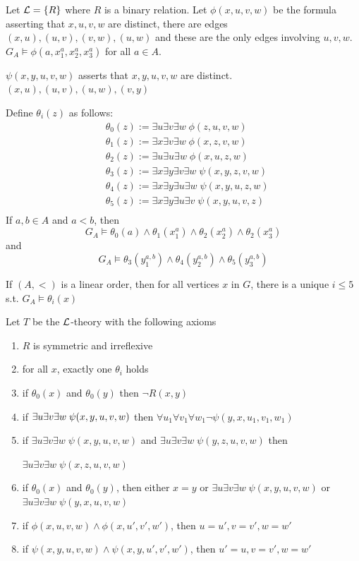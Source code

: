 \documentclass[11pt]{article}
\begin{document}
Let \(\mathcal{L}=\{R\}\) where \(R\) is a binary relation. Let \(\phi(x,u,v,w)\) be the
formula asserting that \(x,u,v,w\) are distinct, there are edges
\((x,u),(u,v),(v,w),(u,w)\) and these are the only edges involving \(u,v,w\).
\(G_A\vDash\phi(a,x_1^a,x_2^a,x_3^a)\) for all \(a\in A\).

\(\psi(x,y,u,v,w)\) asserts that \(x,y,u,v,w\) are distinct. \((x,u),(u,v),(u,w),(v,y)\)

Define \(\theta_i(z)\) as follows:
\begin{align*}
&\theta_0(z):=\exists u\exists v\exists w\;\phi(z,u,v,w)\\
&\theta_1(z):=\exists x\exists v\exists w\;\phi(x,z,v,w)\\
&\theta_2(z):=\exists u\exists u\exists w\;\phi(x,u,z,w)\\
&\theta_3(z):=\exists x\exists y\exists v\exists w\;\psi(x,y,z,v,w)\\
&\theta_4(z):=\exists x\exists y\exists u\exists w\;\psi(x,y,u,z,w)\\
&\theta_5(z):=\exists x\exists y\exists u\exists v\;\psi(x,y,u,v,z)\\
\end{align*}
If \(a,b\in A\) and \(a<b\), then
\begin{equation*}
G_A\vDash\theta_0(a)\wedge\theta_1(x^a_1)\wedge\theta_2(x^a_2)\wedge
\theta_2(x^a_3)
\end{equation*}
and 
\begin{equation*}
G_A\vDash\theta_3(y_1^{a,b})\wedge\theta_4(y_2^{a,b})\wedge\theta_5(
y_3^{a,b})
\end{equation*}
\begin{lemma}[]
If \((A,<)\) is a linear order, then for all vertices \(x\) in \(G\), there is a
unique \(i\le 5\) s.t. \(G_A\vDash\theta_i(x)\)
\end{lemma}

Let \(T\) be the \(\mathcal{L}\)-theory with the following axioms
\begin{enumerate}
\item \(R\) is symmetric and irreflexive
\item for all \(x\), exactly one \(\theta_i\) holds
\item if \(\theta_0(x)\) and \(\theta_0(y)\) then \(\neg R(x,y)\)
\item if \(\exists u\exists v\exists w\;\psi(x,y,u,v,w)\\\) then
\(\forall u_1\forall v_1\forall w_1\neg\psi(y,x,u_1,v_1,w_1)\)
\item if \(\exists u\exists v\exists w\;\psi(x,y,u,v,w)\) and 
\(\exists u\exists v\exists w\;\psi(y,z,u,v,w)\) then\par
\(\exists u\exists v\exists w\;\psi(x,z,u,v,w)\)
\item if \(\theta_0(x)\) and \(\theta_0(y)\), then either \(x=y\) or 
\(\exists u\exists v\exists w\;\psi(x,y,u,v,w)\) or
\(\exists u\exists v\exists w\;\psi(y,x,u,v,w)\)
\item if \(\phi(x,u,v,w)\wedge\phi(x,u',v',w')\), then
\(u=u',v=v',w=w'\)
\item if \(\psi(x,y,u,v,w)\wedge\psi(x,y,u',v',w')\), then
\(u'=u,v=v',w=w'\)
\end{enumerate}
\end{document}
